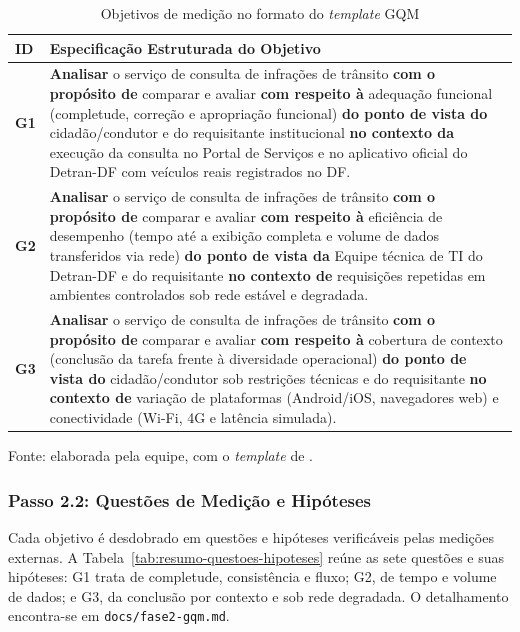 \begin{table}[htbp]
\centering
\caption{Objetivos de medição no formato do \textit{template} GQM}
\label{tab:objetivos-gqm}
\footnotesize
\begin{tabular}{|l|P{12.2cm}|}
\hline
\textbf{ID} & \textbf{Especificação Estruturada do Objetivo} \\ \hline
\textbf{G1} & \textbf{Analisar} o serviço de consulta de infrações de trânsito \textbf{com o propósito de} comparar e avaliar \textbf{com respeito à} adequação funcional (completude, correção e apropriação funcional) \textbf{do ponto de vista do} cidadão/condutor e do requisitante institucional \textbf{no contexto da} execução da consulta no Portal de Serviços e no aplicativo oficial do Detran-DF com veículos reais registrados no DF. \\ \hline
\textbf{G2} & \textbf{Analisar} o serviço de consulta de infrações de trânsito \textbf{com o propósito de} comparar e avaliar \textbf{com respeito à} eficiência de desempenho (tempo até a exibição completa e volume de dados transferidos via rede) \textbf{do ponto de vista da} Equipe técnica de TI do Detran-DF e do requisitante \textbf{no contexto de} requisições repetidas em ambientes controlados sob rede estável e degradada. \\ \hline
\textbf{G3} & \textbf{Analisar} o serviço de consulta de infrações de trânsito \textbf{com o propósito de} comparar e avaliar \textbf{com respeito à} cobertura de contexto (conclusão da tarefa frente à diversidade operacional) \textbf{do ponto de vista do} cidadão/condutor sob restrições técnicas e do requisitante \textbf{no contexto de} variação de plataformas (Android/iOS, navegadores web) e conectividade (Wi-Fi, 4G e latência simulada). \\ \hline
\end{tabular}
\par\smallskip
\raggedright\scriptsize Fonte: elaborada pela equipe, com o \textit{template} de \cite{basili1994gqm}.
\end{table}

\subsubsection{Passo 2.2: Questões de Medição e Hipóteses}
\label{subsec:questoes-hipoteses}

Cada objetivo é desdobrado em questões e hipóteses verificáveis pelas medições externas. A Tabela~\ref{tab:resumo-questoes-hipoteses} reúne as sete questões e suas hipóteses: G1 trata de completude, consistência e fluxo; G2, de tempo e volume de dados; e G3, da conclusão por contexto e sob rede degradada. O detalhamento encontra-se em \texttt{docs/fase2-gqm.md}.


